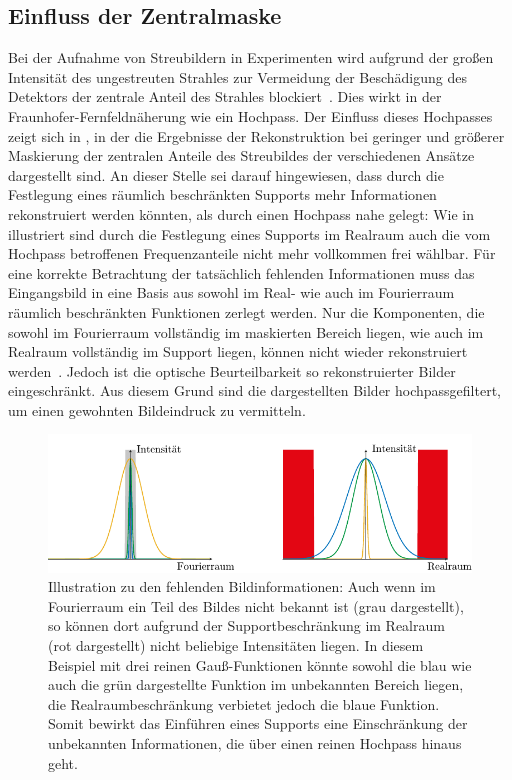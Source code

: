 \subsection{Einfluss der Zentralmaske}
Bei der Aufnahme von Streubildern in Experimenten wird aufgrund der großen Intensität des ungestreuten Strahles zur Vermeidung der Beschädigung des Detektors der zentrale Anteil des Strahles blockiert~\cite{schultz2013chapter7}. Dies wirkt in der Fraunhofer-Fernfeldnäherung wie ein Hochpass. Der Einfluss dieses Hochpasses zeigt sich in , in der die Ergebnisse der Rekonstruktion bei geringer und größerer Maskierung der zentralen Anteile des Streubildes der verschiedenen Ansätze dargestellt sind. An dieser Stelle sei darauf hingewiesen, dass durch die Festlegung eines räumlich beschränkten Supports mehr Informationen rekonstruiert werden könnten, als durch einen Hochpass nahe gelegt: Wie in  illustriert sind durch die Festlegung eines Supports im Realraum auch die vom Hochpass betroffenen Frequenzanteile nicht mehr vollkommen frei wählbar. Für eine korrekte Betrachtung der tatsächlich fehlenden Informationen muss das Eingangsbild in eine Basis aus sowohl im Real- wie auch im Fourierraum räumlich beschränkten Funktionen zerlegt werden. Nur die Komponenten, die sowohl im Fourierraum vollständig im maskierten Bereich liegen, wie auch im Realraum vollständig im Support liegen, können nicht wieder rekonstruiert werden~\cite{thibault2006,ulmer2015}. Jedoch ist die optische Beurteilbarkeit so rekonstruierter Bilder eingeschränkt. Aus diesem Grund sind die dargestellten Bilder hochpassgefiltert, um einen gewohnten Bildeindruck zu vermitteln.
\begin{figure}
	\centering
	\includegraphics[width=.9\textwidth]{images/missing.pdf}
	\caption[Fehlende Bildinformationen]{Illustration zu den fehlenden Bildinformationen: Auch wenn im Fourierraum ein Teil des Bildes nicht bekannt ist (grau dargestellt), so können dort aufgrund der Supportbeschränkung im Realraum (rot dargestellt) nicht beliebige Intensitäten liegen. In diesem Beispiel mit drei reinen Gauß-Funktionen könnte sowohl die blau wie auch die grün dargestellte Funktion im unbekannten Bereich liegen, die Realraumbeschränkung verbietet jedoch die blaue Funktion. Somit bewirkt das Einführen eines Supports eine Einschränkung der unbekannten Informationen, die über einen reinen Hochpass hinaus geht.}
	\label{fig:missing}
\end{figure}
